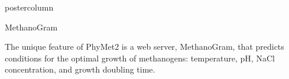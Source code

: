 \documentclass[final]{beamer}\usepackage[]{graphicx}\usepackage[]{color}
\newenvironment{knitrout}{}{} %
\newenvironment{knitrout}{}{} %
\begin{document}
\begin{frame}
\begin{columns}
\begin{column}{.53\textwidth}
\begin{beamercolorbox}[center,wd=\textwidth]{postercolumn}
\begin{minipage}[T]{.95\textwidth}
{%
%     
%     
% 
% 
% 
% 
%       

\vfill

\begin{block}{MethanoGram}
% 
% 
% 
% 
% 

The unique feature of PhyMet2 is a web server, MethanoGram, that predicts conditions for the optimal growth of methanogens: temperature, pH, NaCl concentration, and growth doubling time.

% 


\end{block}}
\end{minipage}
\end{beamercolorbox}
\end{column}
\end{columns}
\end{frame}
\end{document}
